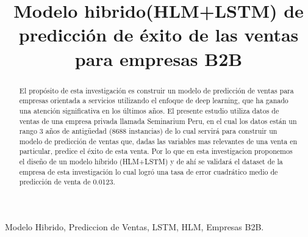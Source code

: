 \documentclass[conference]{IEEEtran}
\begin{document}
\title{Modelo hibrido(HLM+LSTM) de predicción de éxito de las ventas para empresas B2B}


\author{
    \and
}

\maketitle

\begin{abstract}
 El propósito de esta investigación es construir un modelo de predicción de ventas para empresas orientada a servicios utilizando el enfoque de deep learning, que ha ganado una atención significativa en los últimos años. El presente estudio utiliza datos de ventas de una empresa privada llamada Seminarium Peru, en el cual los datos están un rango 3 años de antigüedad (8688 instancias) de lo cual servirá para construir un modelo de predicción de ventas que, dadas las variables mas relevantes de una venta en particular, predice el éxito de esta venta. 
Por lo que en esta investigacion proponemos el diseño de un modelo híbrido (HLM+LSTM) y de ahí se validará el dataset de la empresa de esta investigación lo cual logró una tasa de error cuadrático medio de predicción de venta de 0.0123.\end{abstract}
\begin{IEEEkeywords} 
     Modelo Hibrido, Prediccion de Ventas, LSTM, HLM, Empresas B2B.
\end{IEEEkeywords}
\end{document}
